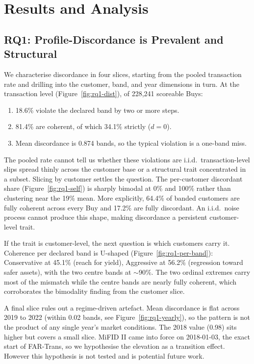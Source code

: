 \section{Results and Analysis}
\label{sec:results}

\subsection{RQ1: Profile-Discordance is Prevalent and Structural}
\label{sec:results:rq1}

We characterise discordance in four slices, starting from the pooled transaction rate and drilling into the customer, band, and year dimensions in turn. At the transaction level (Figure~\ref{fig:rq1-dist}), of 228{,}241 scoreable Buys:
\begin{enumerate}
    \item 18.6\% violate the declared band by two or more steps.
    \item 81.4\% are coherent, of which 34.1\% strictly ($d = 0$).
    \item Mean discordance is 0.874 bands, so the typical violation is a one-band miss.
\end{enumerate}

The pooled rate cannot tell us whether these violations are i.i.d.\ transaction-level slips spread thinly across the customer base or a structural trait concentrated in a subset. Slicing by customer settles the question. The per-customer discordant share (Figure~\ref{fig:rq1-self}) is sharply bimodal at 0\% and 100\% rather than clustering near the 19\% mean. More explicitly, 64.4\% of banded customers are fully coherent across every Buy and 17.2\% are fully discordant. An i.i.d.\ noise process cannot produce this shape, making discordance a persistent customer-level trait.

If the trait is customer-level, the next question is which customers carry it. Coherence per declared band is U-shaped (Figure~\ref{fig:rq1-per-band}): Conservative at 45.1\% (reach for yield), Aggressive at 56.2\% (regression toward safer assets), with the two centre bands at $\sim$90\%. The two ordinal extremes carry most of the mismatch while the centre bands are nearly fully coherent, which corroborates the bimodality finding from the customer slice.

A final slice rules out a regime-driven artefact. Mean discordance is flat across 2019 to 2022 (within 0.02 bands, see Figure~\ref{fig:rq1-yearly}), so the pattern is not the product of any single year's market conditions. The 2018 value (0.98) sits higher but covers a small slice. MiFID II came into force on 2018-01-03, the exact start of FAR-Trans, so we hypothesise the elevation as a transition effect. However this hypothesis is not tested and is potential future work.

